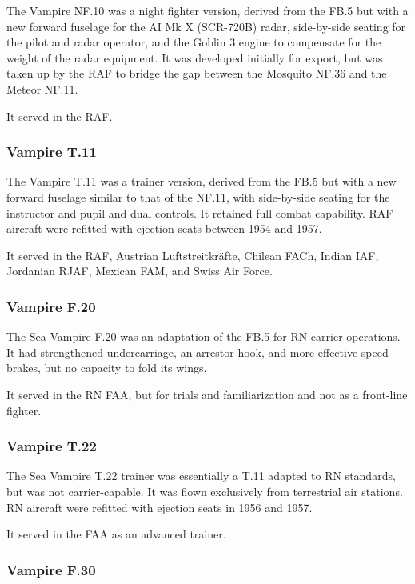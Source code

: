 The Vampire NF.10 was a night fighter version, derived from the FB.5 but with a new forward fuselage for the AI Mk X (SCR-720B) radar, side-by-side seating for the pilot and radar operator, and the Goblin 3 engine to compensate for the weight of the radar equipment. It was developed initially for export, but was taken up by the RAF to bridge the gap between the Mosquito NF.36 and the Meteor NF.11.

It served in the RAF.

\subsubsection{Vampire T.11}

The Vampire T.11 was a trainer version, derived from the FB.5 but with a new forward fuselage similar to that of the NF.11, with side-by-side seating for the instructor and pupil and dual controls. It retained full combat capability. RAF aircraft were refitted with ejection seats between 1954 and 1957.

It served in the RAF, Austrian Luftstreitkräfte, Chilean FACh, Indian IAF, Jordanian RJAF, Mexican FAM, and Swiss Air Force.

\subsubsection{Vampire F.20}

The Sea Vampire F.20 was an adaptation of the FB.5 for RN carrier operations. It had strengthened undercarriage, an arrestor hook, and more effective speed brakes, but no capacity to fold its wings.

It served in the RN FAA, but for trials and familiarization and not as a front-line fighter.

\subsubsection{Vampire T.22}

The Sea Vampire T.22 trainer was essentially a T.11 adapted to RN standards, but was not carrier-capable. It was flown exclusively from terrestrial air stations. RN aircraft were refitted with ejection seats in 1956 and 1957.

It served in the FAA as an advanced trainer.
\subsubsection{Vampire F.30}

